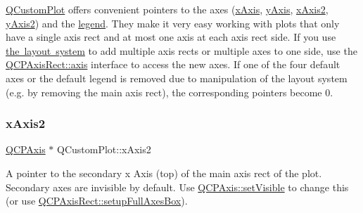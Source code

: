 \mbox{\hyperlink{class_q_custom_plot}{Q\+Custom\+Plot}} offers convenient pointers to the axes (\mbox{\hyperlink{class_q_custom_plot_a9a79cd0158a4c7f30cbc702f0fd800e4}{x\+Axis}}, \mbox{\hyperlink{class_q_custom_plot_af6fea5679725b152c14facd920b19367}{y\+Axis}}, \mbox{\hyperlink{class_q_custom_plot_ada41599f22cad901c030f3dcbdd82fd9}{x\+Axis2}}, \mbox{\hyperlink{class_q_custom_plot_af13fdc5bce7d0fabd640f13ba805c0b7}{y\+Axis2}}) and the \mbox{\hyperlink{class_q_custom_plot_a4eadcd237dc6a09938b68b16877fa6af}{legend}}. They make it very easy working with plots that only have a single axis rect and at most one axis at each axis rect side. If you use \mbox{\hyperlink{}{the layout system}} to add multiple axis rects or multiple axes to one side, use the \mbox{\hyperlink{class_q_c_p_axis_rect_a583ae4f6d78b601b732183f6cabecbe1}{Q\+C\+P\+Axis\+Rect\+::axis}} interface to access the new axes. If one of the four default axes or the default legend is removed due to manipulation of the layout system (e.\+g. by removing the main axis rect), the corresponding pointers become 0. \mbox{\label{class_q_custom_plot_ada41599f22cad901c030f3dcbdd82fd9}} 
\subsubsection{\texorpdfstring{x\+Axis2}{xAxis2}}
{\footnotesize\ttfamily \mbox{\hyperlink{class_q_c_p_axis}{Q\+C\+P\+Axis}} $\ast$ Q\+Custom\+Plot\+::x\+Axis2}

A pointer to the secondary x Axis (top) of the main axis rect of the plot. Secondary axes are invisible by default. Use \mbox{\hyperlink{class_q_c_p_layerable_a3bed99ddc396b48ce3ebfdc0418744f8}{Q\+C\+P\+Axis\+::set\+Visible}} to change this (or use \mbox{\hyperlink{class_q_c_p_axis_rect_a5fa906175447b14206954f77fc7f1ef4}{Q\+C\+P\+Axis\+Rect\+::setup\+Full\+Axes\+Box}}).

